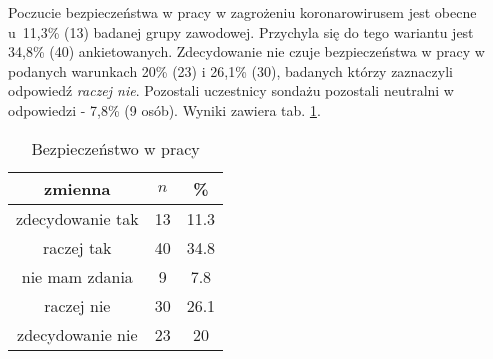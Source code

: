 

Poczucie bezpieczeństwa w pracy w zagrożeniu koronarowirusem jest obecne u~11,3\% (13) badanej grupy zawodowej. Przychyla się do tego wariantu jest 34,8\% (40) ankietowanych.  Zdecydowanie nie czuje bezpieczeństwa w pracy w podanych warunkach 20\% (23) i 26,1\% (30), badanych którzy zaznaczyli odpowiedź \textit{raczej nie}. Pozostali uczestnicy sondażu pozostali neutralni w odpowiedzi - 7,8\% (9 osób). Wyniki zawiera tab. \ref{tab:Q18}.

\begin{table}[H]
\caption{Bezpieczeństwo w pracy}
\centering
\begin{tabular}{ | c | c | c |}
\hline
zmienna & $n$ & \% \\
\hline
zdecydowanie tak  &  13  & 11.3\\
\hline
raczej tak  &  40  & 34.8\\
\hline
nie mam zdania  &  9  & 7.8 \\
\hline
raczej nie  &  30  & 26.1 \\
\hline
zdecydowanie nie  &  23  & 20 \\
\hline
\end{tabular}
\label{tab:Q18}
\end{table}

